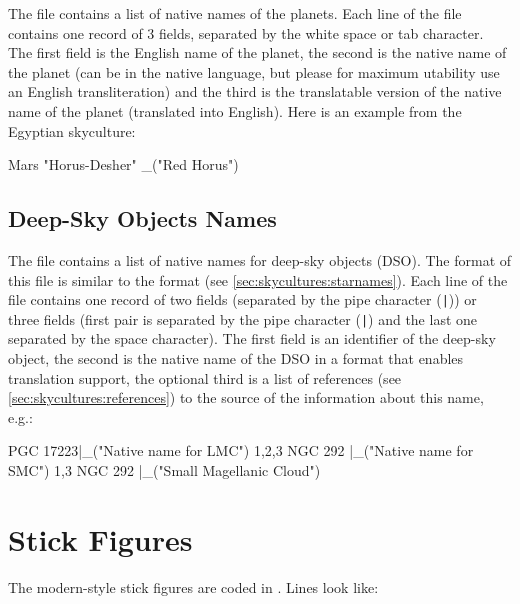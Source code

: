 The file  contains a list of native names of
the planets. Each line of the file contains one record of 3 fields,
separated by the white space or tab character. The first field is the
English name of the planet, the second is the native name of the
planet (can be in the native language, but please for maximum
utability use an English transliteration) and the third is the
translatable version of the native name of the planet (translated into
English). Here is an example from the Egyptian skyculture:

\begin{configfile}
Mars	"Horus-Desher"	_("Red Horus")
\end{configfile}

\subsection{Deep-Sky Objects Names}
\label{sec:skycultures:dsonames}

\noindent{}The file  contains a list of native names for
deep-sky objects (DSO). The format of this file is similar to the 
 format (see \ref{sec:skycultures:starnames}).
Each line of the file contains one record of two fields (separated 
by the pipe character (\texttt{|})) or three fields (first pair is 
separated by the pipe character (\texttt{|}) and the last one separated 
by the space character). The first field is an identifier of the
deep-sky object, the second is the native name of the DSO in a 
format that enables translation support, the optional third is a  
list of references (see \ref{sec:skycultures:references}) to the source 
of the information about this name, e.g.:
\begin{configfile}
PGC 17223|_("Native name for LMC") 1,2,3
NGC 292  |_("Native name for SMC") 1,3
NGC 292  |_("Small Magellanic Cloud")
\end{configfile}

\section{Stick Figures}
\label{sec:skycultures:stickfigures}

The modern-style stick figures are coded in . Lines
look like:

